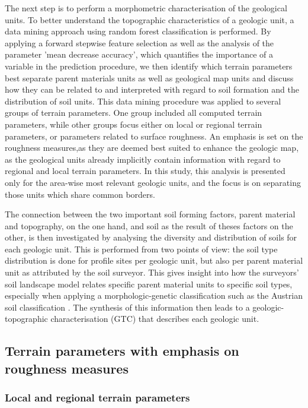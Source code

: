 \documentclass[preprint,12pt,authoryear]{elsarticle}
\begin{document}
The next step is to perform a morphometric characterisation of the geological units. To better understand the topographic characteristics of a geologic unit, a data mining approach using random forest classification is performed. By applying a forward stepwise feature selection as well as the analysis of the parameter 'mean decrease accuracy', which quantifies the importance of a variable in the prediction procedure, we then identify which terrain parameters best separate parent materials units as well as geological map units and discuss how they can be related to and interpreted with regard to soil formation and the distribution of soil units. This data mining procedure was applied to several groups of terrain parameters. One group included all computed terrain parameters, while other groups focus either on local or regional terrain parameters, or parameters related to surface roughness. An emphasis is set on the roughness measures,as they are deemed best suited to enhance the geologic map, as the geological units already implicitly contain information with regard to regional and local terrain parameters. In this study, this analysis is presented only for the area-wise most relevant geologic units, and the focus is on separating those units which share common borders.

The connection between the two important soil forming factors, parent material and topography, on the one hand, and soil as the result of theses factors on the other, is then investigated by analysing the diversity and distribution of soils for each geologic unit. This is performed from two points of view: the soil type distribution is done for profile sites per geologic unit, but also per parent material unit as attributed by the soil surveyor. This gives insight into how the surveyors' soil landscape model relates specific parent material units to specific soil types, especially when applying a morphologic-genetic classification such as the Austrian soil classification \citep{Nestroy2011}. The synthesis of this information then leads to a geologic-topographic characterisation (GTC) that describes each geologic unit. 
\subsection{Terrain parameters with emphasis on roughness measures}
\subsubsection{Local and regional terrain parameters}
\end{document}

